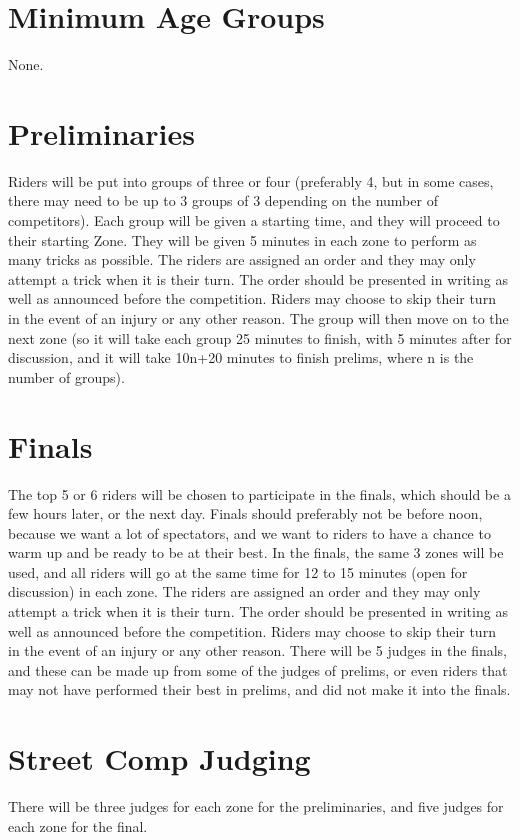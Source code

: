 \section{Minimum Age Groups}
None.

\section{Preliminaries}
Riders will be put into groups of three or four (preferably 4, but in some cases, there may need to be up to 3 groups of 3 depending on the number of competitors).
Each group will be given a starting time, and they will proceed to their starting Zone.
They will be given 5 minutes in each zone to perform as many tricks as possible.
The riders are assigned an order and they may only attempt a trick when it is their turn.
The order should be presented in writing as well as announced before the competition.
Riders may choose to skip their turn in the event of an injury or any other reason.
The group will then move on to the next zone (so it will take each group 25 minutes to finish, with 5 minutes after for discussion, and it will take 10n+20 minutes to finish prelims, where n is the number of groups).

\section{Finals}
The top 5 or 6 riders will be chosen to participate in the finals, which should be a few hours later, or the next day.
Finals should preferably not be before noon, because we want a lot of spectators, and we want to riders to have a chance to warm up and be ready to be at their best.
In the finals, the same 3 zones will be used, and all riders will go at the same time for 12 to 15 minutes (open for discussion) in each zone.
The riders are assigned an order and they may only attempt a trick when it is their turn.
The order should be presented in writing as well as announced before the competition.
Riders may choose to skip their turn in the event of an injury or any other reason.
There will be 5 judges in the finals, and these can be made up from some of the judges of prelims, or even riders that may not have performed their best in prelims, and did not make it into the finals.

\section{Street Comp Judging}
There will be three judges for each zone for the preliminaries, and five judges for each zone for the final.

